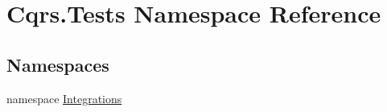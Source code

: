 \hypertarget{namespaceCqrs_1_1Tests}{}\section{Cqrs.\+Tests Namespace Reference}
\label{namespaceCqrs_1_1Tests}
\subsection*{Namespaces}
\begin{DoxyCompactItemize}
\item 
namespace \hyperlink{namespaceCqrs_1_1Tests_1_1Integrations}{Integrations}
\end{DoxyCompactItemize}
